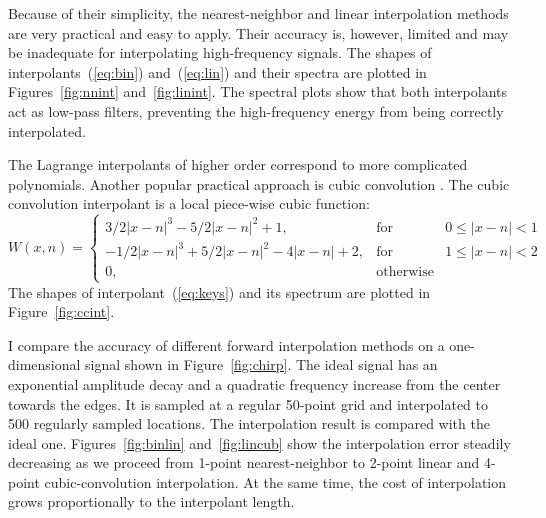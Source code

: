 
Because of their simplicity, the nearest-neighbor and linear
interpolation methods are very practical and easy to apply. Their
accuracy is, however, limited and may be inadequate for
interpolating high-frequency signals. The shapes of
interpolants~(\ref{eq:bin}) and~(\ref{eq:lin}) and their spectra are
plotted in Figures~\ref{fig:nnint} and~\ref{fig:linint}. The spectral
plots show that both interpolants act as low-pass filters, preventing
the high-frequency energy from being correctly interpolated.
\par
{}

The Lagrange interpolants of higher order correspond to more
complicated polynomials. Another popular practical approach is cubic
convolution \cite[]{keys}. The cubic convolution interpolant is a local
piece-wise cubic function:
\begin{equation}\label{eq:keys}
  W (x, n) = \left\{\begin{array}{lcr}
3/2 |x-n|^3 - 5/2 |x-n|^2 + 1, & \mbox{for} & 0 \leq |x-n| < 1 \\
-1/2 |x-n|^3 + 5/2 |x-n|^2 - 4 |x-n| + 2, & \mbox{for} & 1 \leq |x-n| < 2 \\
0, & \mbox{otherwise} &
\end{array}\right.
\end{equation}
The shapes of interpolant~(\ref{eq:keys}) and its spectrum are plotted
in Figure~\ref{fig:ccint}.  



I compare the accuracy of different forward interpolation methods on a
one-dimensional signal shown in Figure~\ref{fig:chirp}. The ideal
signal has an exponential amplitude decay and a quadratic frequency
increase from the center towards the edges. It is sampled at a regular
50-point grid and interpolated to 500 regularly sampled locations. The
interpolation result is compared with the ideal one.
Figures~\ref{fig:binlin} and~\ref{fig:lincub} show the interpolation
error steadily decreasing as we proceed from 1-point nearest-neighbor
to 2-point linear and 4-point cubic-convolution interpolation. At the
same time, the cost of interpolation grows proportionally to the
interpolant length.

